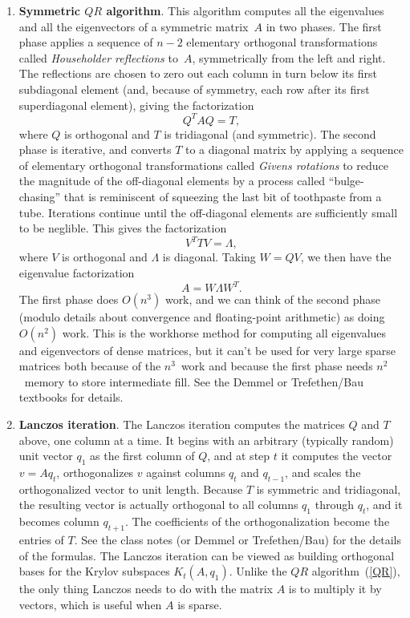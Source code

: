\documentclass[11pt]{article}
\begin{document}
\begin{enumerate}
\item\label{QR}{\bf Symmetric $QR$ algorithm}.
This algorithm computes all the eigenvalues and all the eigenvectors
of a symmetric matrix~$A$ in two phases. 
The first phase applies a sequence of $n-2$ elementary orthogonal 
transformations called {\em Householder reflections} to~$A$,
symmetrically from the left and right.
The reflections are chosen to zero out each column in turn 
below its first subdiagonal element (and, because of symmetry,
each row after its first superdiagonal element), 
giving the factorization
$$Q^TAQ = T,$$
where $Q$ is orthogonal and $T$ is tridiagonal (and symmetric).
The second phase is iterative, and converts $T$ to a diagonal matrix
by applying a sequence of elementary orthogonal transformations called
{\em Givens rotations} to reduce the magnitude of the off-diagonal
elements by a process called ``bulge-chasing'' that is 
reminiscent of squeezing the last bit of toothpaste from a tube.
Iterations continue until the off-diagonal elements are sufficiently small
to be neglible.
This gives the factorization
$$V^TTV = \Lambda,$$
where $V$ is orthogonal and $\Lambda$ is diagonal.
Taking $W=QV$, we then have the eigenvalue factorization
$$A = W\Lambda W^T.$$
The first phase does $O(n^3)$ work, and we can think of the second phase
(modulo details about convergence and floating-point arithmetic)
as doing $O(n^2)$ work. 
This is the workhorse method for computing all eigenvalues and eigenvectors
of dense matrices, 
but it can't be used for very large sparse matrices
both because of the $n^3$~work and because the first phase 
needs $n^2$~memory to store intermediate fill.
See the Demmel or Trefethen/Bau textbooks for details.

\item{\bf Lanczos iteration}.
The Lanczos iteration computes the matrices $Q$ and $T$ above,
one column at a time.
It begins with an arbitrary (typically random)
unit vector $q_1$ as the first column
of $Q$, and at step $t$ it computes the vector $v=Aq_t$,
orthogonalizes $v$ against columns $q_t$ and $q_{t-1}$,
and scales the orthogonalized vector to unit length.
Because $T$ is symmetric and tridiagonal, 
the resulting vector is actually orthogonal to all columns $q_1$ 
through $q_t$, and it becomes column $q_{t+1}$.
The coefficients of the orthogonalization become the entries of $T$.
See the class notes (or Demmel or Trefethen/Bau) for the details
of the formulas.
The Lanczos iteration can be viewed as building orthogonal bases 
for the Krylov subspaces $K_t(A,q_1)$.
Unlike the $QR$ algorithm~(\ref{QR}),
the only thing Lanczos needs to do with
the matrix $A$ is to multiply it by vectors, 
which is useful when $A$ is sparse.


\end{enumerate}
\end{document}

